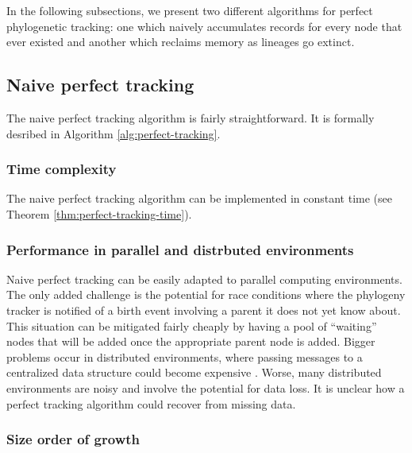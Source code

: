 In the following subsections, we present two different algorithms for perfect phylogenetic tracking: one which naively accumulates records for every node that ever existed and another which reclaims memory as lineages go extinct.

\subsection{Naive perfect tracking}
\label{sec:naive-perfect-tracking}

The naive perfect tracking algorithm is fairly straightforward.
It is formally desribed in Algorithm \ref{alg:perfect-tracking}.



\subsubsection{Time complexity}

The naive perfect tracking algorithm can be implemented in constant time (see Theorem \ref{thm:perfect-tracking-time}).




\subsubsection{Performance in parallel and distrbuted environments}
\label{sec:perfect-tracking-distrbuted}

Naive perfect tracking can be easily adapted to parallel computing environments.
The only added challenge is the potential for race conditions where the phylogeny tracker is notified of a birth event involving a parent it does not yet know about.
This situation can be mitigated fairly cheaply by having a pool of ``waiting'' nodes that will be added once the appropriate parent node is added.
Bigger problems occur in distributed environments, where passing messages to a centralized data structure could become expensive \citep{moreno2022hereditary}.
Worse, many distributed environments are noisy and involve the potential for data loss.
It is unclear how a perfect tracking algorithm could recover from missing data.

\subsubsection{Size order of growth}

